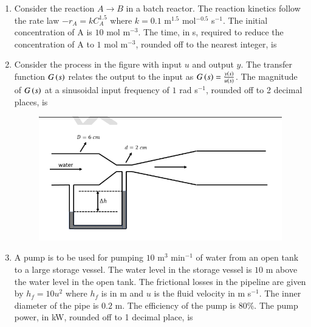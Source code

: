 \documentclass[journal,12pt,onecolumn]{IEEEtran}
\theoremstyle{remark}
\begin{document}
\begin{enumerate}
	\hfill{}
	
	\item Consider the reaction $A \to B$ in a batch reactor. The reaction kinetics follow the rate law $-r_A = kC_A^{1.5}$ where $k = 0.1$ m$^{1.5}$ mol$^{-0.5}$ s$^{-1}$. The initial concentration of A is $10$ mol m$^{-3}$. The time, in s, required to reduce the concentration of A to $1$ mol m$^{-3}$, rounded off to the nearest integer, is \underline{\hspace{2cm}}
	
	\hfill{}
	
	\item Consider the process in the figure with input $u$ and output $y$. The transfer function $G\left(s\right)$ relates the output to the input as $G\left(s\right) = \frac{y\left(s\right)}{u\left(s\right)}$. The magnitude of $G\left(s\right)$ at a sinusoidal input frequency of $1$ rad s$^{-1}$, rounded off to 2 decimal places, is \underline{\hspace{2cm}}
	\begin{figure}
		\includegraphics[width = 0.8\columnwidth]{q60}
		\caption*{}
		\label{fig:q61}
	\end{figure}
	
	\hfill{}
	
	\item A pump is to be used for pumping $10$ m$^3$ min$^{-1}$ of water from an open tank to a large storage vessel. The water level in the storage vessel is $10$ m above the water level in the open tank. The frictional losses in the pipeline are given by $h_f = 10u^2$ where $h_f$ is in m and $u$ is the fluid velocity in m s$^{-1}$. The inner diameter of the pipe is $0.2$ m. The efficiency of the pump is $80\%$. The pump power, in kW, rounded off to 1 decimal place, is \underline{\hspace{2cm}} 
	

\end{enumerate}
\end{document}
